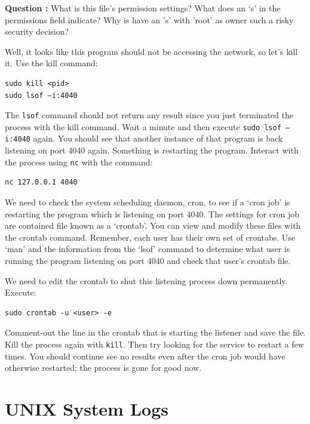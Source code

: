 \documentclass{article}
\begin{document}
\textbf{Question :}  What is this file's permission settings? What does an ‘s’ in the permissions field indicate? Why is have an 's' with 'root' as owner such a risky security decision? \medskip
\addtocounter{Question}{1}

Well, it looks like this program should not be accessing the network, so let’s kill it. Use the kill command:
\begin{verbatim}
sudo kill <pid>
sudo lsof –i:4040
\end{verbatim}

The {\tt lsof} command should not return any result since you just terminated the process with the kill command. Wait a minute and then execute {\tt sudo lsof –i:4040} again. You should see that another instance of that program is back listening on port 4040 again. Something is restarting the program.  Interact with the process using {\tt nc} with the command:

\begin{verbatim}
nc 127.0.0.1 4040
\end{verbatim} 

We need to check the system scheduling daemon, cron, to see if a `cron job' is restarting the program which is listening on port 4040. The settings for cron job are contained file known as a `crontab'.  You can view and modify these files with the crontab command. Remember, each user has their own set of crontabs. Use `man' and the information from the `lsof' command to determine what user is running the program listening on port 4040 and check that user's crontab file.\medskip\\

\medskip

We need to edit the crontab to shut this listening process down permanently. Execute:
\begin{verbatim}
sudo crontab -u <user> -e
\end{verbatim}

Comment-out the line in the crontab that is starting the listener and save the file. Kill the process again with {\tt kill}. 
Then try looking for the service to restart a few times. You should continue see no results even after the cron job would have otherwise restarted; the process is gone for good now.

\section{UNIX System Logs}
\end{document}
